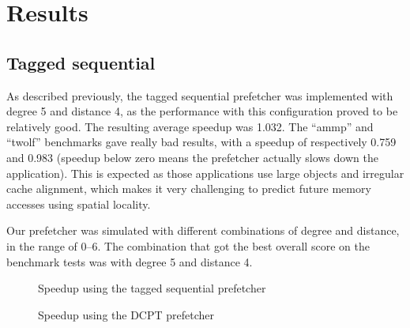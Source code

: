\section{Results}

\subsection{Tagged sequential}

As described previously, the tagged sequential prefetcher was  implemented with
degree 5 and distance 4, as the performance  with this configuration proved to
be relatively good. The  resulting average speedup was 1.032. The ``ammp'' and
``twolf'' benchmarks gave  really bad results, with a speedup of respectively
0.759 and 0.983  (speedup below zero means the prefetcher actually slows down
the application). This is expected as those applications use large objects and
irregular cache alignment,  which makes it very challenging to predict future
memory accesses using spatial locality.


Our prefetcher was simulated with different combinations of degree and distance,
in the range of 0--6. The combination that got the best overall score on the
benchmark tests was with degree 5 and distance 4.

\begin{figure}[tbp]
\begin{center}
    
    \caption{Speedup using the tagged sequential prefetcher}
    \label{graph:tagged-sequential}
\end{center}
\end{figure}

\begin{figure}[tbp]
\begin{center}
    
    \caption{Speedup using the DCPT prefetcher}
    \label{graph:dcpt}
\end{center}
\end{figure}
